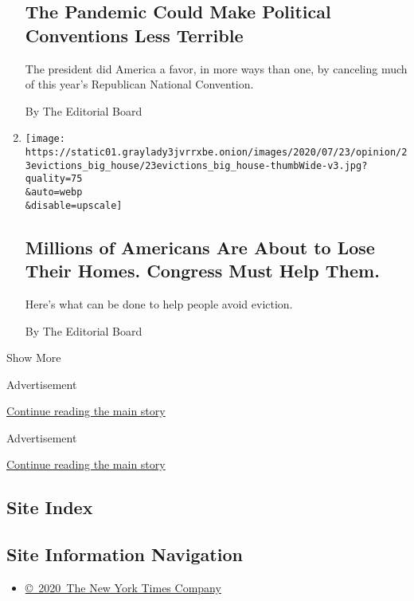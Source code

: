 \begin{enumerate}
{  \subsection{The Pandemic Could Make Political Conventions Less
  Terrible}\label{the-pandemic-could-make-political-conventions-less-terrible}}

  The president did America a favor, in more ways than one, by canceling
  much of this year's Republican National Convention.

  By The Editorial Board
\item
  \href{/2020/07/23/opinion/coronavirus-evictions-rent.html}{}

  \texttt{[image: https://static01.graylady3jvrrxbe.onion/images/2020/07/23/opinion/23evictions\_big\_house/23evictions\_big\_house-thumbWide-v3.jpg?quality=75\\\&auto=webp\\\&disable=upscale]}

  \hypertarget{millions-of-americans-are-about-to-lose-their-homes-congress-must-help-them}{%
  \subsection{Millions of Americans Are About to Lose Their Homes.
  Congress Must Help
  Them.}\label{millions-of-americans-are-about-to-lose-their-homes-congress-must-help-them}}

  Here's what can be done to help people avoid eviction.

  By The Editorial Board
\end{enumerate}

Show More

Advertisement

\protect\hyperlink{after-mid1}{Continue reading the main story}

Advertisement

\protect\hyperlink{after-mktg}{Continue reading the main story}

\hypertarget{site-index}{%
\subsection{Site Index}\label{site-index}}

\hypertarget{site-information-navigation}{%
\subsection{Site Information
Navigation}\label{site-information-navigation}}

\begin{itemize}
\tightlist
\item
  \href{https://help.nytimes3xbfgragh.onion/hc/en-us/articles/115014792127-Copyright-notice}{©~2020~The
  New York Times Company}
\end{itemize}


